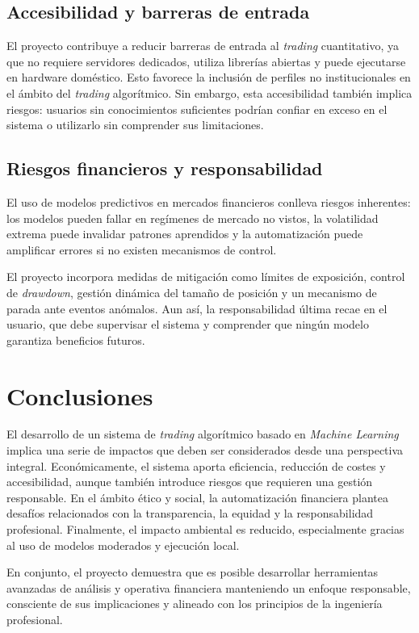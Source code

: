 \subsection{Accesibilidad y barreras de entrada}

El proyecto contribuye a reducir barreras de entrada al \textit{trading} cuantitativo, ya que no requiere servidores dedicados, utiliza librerías
abiertas y puede ejecutarse en hardware doméstico. Esto favorece la inclusión de perfiles no institucionales en el ámbito del \textit{trading}
algorítmico. Sin embargo, esta accesibilidad también implica riesgos: usuarios sin conocimientos suficientes podrían confiar en exceso en el sistema o
utilizarlo sin comprender sus limitaciones.

\subsection{Riesgos financieros y responsabilidad}

El uso de modelos predictivos en mercados financieros conlleva riesgos inherentes: los modelos pueden fallar en regímenes de mercado no vistos, la
volatilidad extrema puede invalidar patrones aprendidos y la automatización puede amplificar errores si no existen mecanismos de control.

El proyecto incorpora medidas de mitigación como límites de exposición, control de \textit{drawdown}, gestión dinámica del tamaño de posición y un
mecanismo de parada ante eventos anómalos. Aun así, la responsabilidad última recae en el usuario, que debe supervisar el sistema y comprender que
ningún modelo garantiza beneficios futuros.

\section{Conclusiones}

El desarrollo de un sistema de \textit{trading} algorítmico basado en \textit{Machine Learning} implica una serie de impactos que deben ser
considerados desde una perspectiva integral. Económicamente, el sistema aporta eficiencia, reducción de costes y accesibilidad, aunque también
introduce riesgos que requieren una gestión responsable. En el ámbito ético y social, la automatización financiera plantea desafíos relacionados con
la transparencia, la equidad y la responsabilidad profesional. Finalmente, el impacto ambiental es reducido, especialmente gracias al uso de modelos
moderados y ejecución local.

En conjunto, el proyecto demuestra que es posible desarrollar herramientas avanzadas de análisis y operativa financiera manteniendo un enfoque
responsable, consciente de sus implicaciones y alineado con los principios de la ingeniería profesional.
